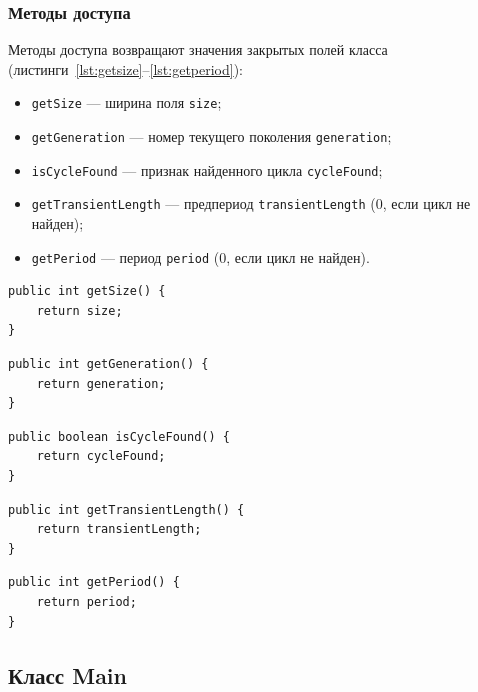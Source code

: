 \subsubsection*{Методы доступа}

Методы доступа возвращают значения закрытых полей класса (листинги~\ref{lst:getsize}--\ref{lst:getperiod}):
\begin{itemize}
	\item \texttt{getSize} --- ширина поля \texttt{size};
	\item \texttt{getGeneration} --- номер текущего поколения \texttt{generation};
	\item \texttt{isCycleFound} --- признак найденного цикла \texttt{cycleFound};
	\item \texttt{getTransientLength} --- предпериод \texttt{transientLength} (0, если цикл не найден);
	\item \texttt{getPeriod} --- период \texttt{period} (0, если цикл не найден).
\end{itemize}

\begin{lstlisting}[caption={Метод getSize()}, label={lst:getsize}]
public int getSize() {
	return size;
}
\end{lstlisting}

\begin{lstlisting}[caption={Метод getGeneration()}, label={lst:getgeneration}]
public int getGeneration() {
	return generation;
}
\end{lstlisting}

\begin{lstlisting}[caption={Метод isCycleFound()}, label={lst:iscyclefound}]
public boolean isCycleFound() {
	return cycleFound;
}
\end{lstlisting}

\begin{lstlisting}[caption={Метод getTransientLength()}, label={lst:gettransient}]
public int getTransientLength() {
	return transientLength;
}
\end{lstlisting}

\begin{lstlisting}[caption={Метод getPeriod()}, label={lst:getperiod}]
public int getPeriod() {
	return period;
}
\end{lstlisting}

\subsection{Класс Main}


